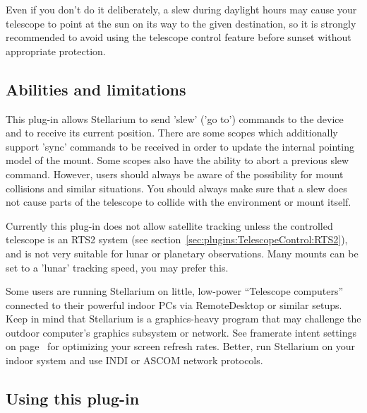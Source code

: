 Even if you don't do it deliberately, a slew during daylight hours may
cause your telescope to point at the sun on its way to the given
destination, so it is strongly recommended to avoid using the
telescope control feature before sunset without appropriate
protection.



\subsection{Abilities and limitations}
\label{sec:plugins:TelescopeControl:Limitations}

This plug-in allows Stellarium to send 'slew' ('go to') commands
to the device and to receive its current position. There are some scopes which
additionally support 'sync' commands to be received in order to update the internal
pointing model of the mount. Some scopes also have the ability to abort a previous 
slew command. However, users should always be aware of the possibility for mount 
collisions and similar situations. You should always make sure that a slew does 
not cause parts of the telescope to collide with the environment or mount itself. 

Currently this plug-in does not allow satellite tracking unless the controlled 
telescope is an RTS2 system (see section~\ref{sec:plugins:TelescopeControl:RTS2}), 
and is not very suitable for lunar or planetary observations. 
Many mounts can be set to a 'lunar' tracking speed, you may prefer this. 

Some users are running Stellarium on little, low-power ``Telescope computers'' connected to 
their powerful indoor PCs via RemoteDesktop or similar setups. Keep in mind that Stellarium 
is a graphics-heavy program that may challenge the outdoor computer's graphics subsystem or network.
See framerate intent settings on page~\pageref{sec:gui:configuration:tools:fps} for optimizing your screen refresh rates. 
Better, run Stellarium on your indoor system and use INDI or ASCOM network protocols.

\subsection{Using this plug-in}
\label{sec:plugins:TelescopeControl:using}

